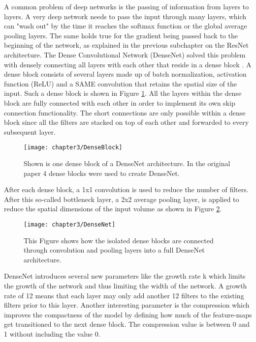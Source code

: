 A common problem of deep networks is the passing of information from layers to layers. A very deep network needs to pass the input through many layers, which can "wash out" by the time it reaches the softmax function or the global average pooling layers. The same holds true for the gradient being passed back to the beginning of the network, as explained in the previous subchapter on the ResNet architecture. The Dense Convolutional Network (DenseNet) solved this problem with densely connecting all layers with each other that reside in a dense block \cite{huang2017densely}. A dense block
consists of several layers made up of batch normalization, activation function (ReLU) and a SAME convolution that retains the spatial size of the input. Such a dense block is shown in Figure \ref{fig:DenseBlock}. All the layers within the dense block are fully connected with each other in order to implement its own skip connection functionality. The short connections are only possible within a dense block since all the filters are stacked on top of each other and forwarded to every subsequent layer.\\


\begin{figure}[H]
  \centering
  \caption{Shown is one dense block of a DenseNet architecture. In the original paper 4 dense blocks were used to create DenseNet. \cite{huang2017densely}}
  \texttt{[image: chapter3/DenseBlock]}
  \label{fig:DenseBlock}
\end{figure}

After each dense block, a 1x1 convolution is used to reduce the number of filters. After this so-called bottleneck layer, a 2x2 average pooling layer, is applied to reduce the spatial dimensions of the input volume as shown in Figure \ref{fig:DenseNet}.\\


\begin{figure}[H]
  \centering
  \caption{This Figure shows how the isolated dense blocks are connected through convolution and pooling layers into a full DenseNet architecture. \cite{huang2017densely}}
  \texttt{[image: chapter3/DenseNet]}
  \label{fig:DenseNet}
\end{figure}

DenseNet introduces several new parameters like the growth rate k which limits the growth of the network and thus limiting the width of the network. A growth rate of 12 means that each layer may only add another 12 filters to the existing filters prior to this layer. Another interesting parameter is the compression which improves the compactness of the model by defining how much of the feature-maps get transitioned to the next dense block. The compression value is between 0 and 1 without including the value 0.

